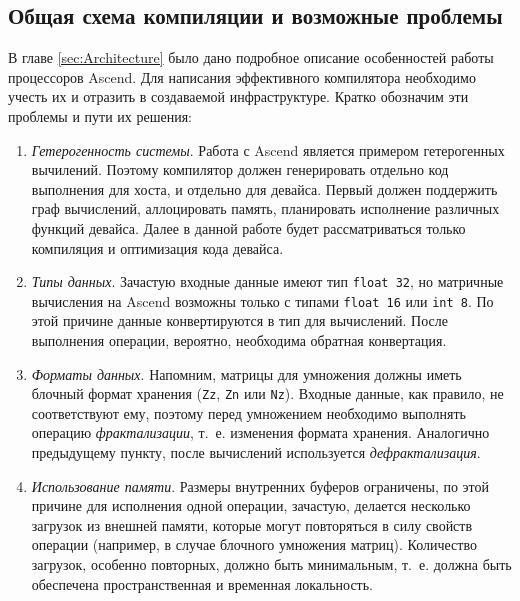 \subsection{Общая схема компиляции и возможные проблемы}
\label{impl:problem}

В главе \ref{sec:Architecture} было дано подробное описание особенностей работы процессоров Ascend.
Для написания эффективного компилятора необходимо учесть их и отразить
в создаваемой инфраструктуре. Кратко обозначим эти проблемы и пути их решения:

\begin{enumerate}
    \item \textit{Гетерогенность системы}. Работа с Ascend является примером
          гетерогенных вычилений. Поэтому компилятор должен генерировать
          отдельно код выполнения для хоста, и отдельно для девайса. Первый
          должен поддержить граф вычислений, аллоцировать память, планировать
          исполнение различных функций девайса. Далее в данной работе будет
          рассматриваться только компиляция и оптимизация кода девайса.
    
    \item \textit{Типы данных}. Зачастую входные данные имеют тип \texttt{float 32},
          но матричные вычисления на Ascend возможны только с типами
          \texttt{float 16} или \texttt{int 8}. По этой причине данные
          конвертируются в тип для вычислений. После выполнения операции,
          вероятно, необходима обратная конвертация.

    \item \textit{Форматы данных}. Напомним, матрицы для умножения должны иметь
          блочный формат хранения (\texttt{Zz}, \texttt{Zn} или \texttt{Nz}).
          Входные данные, как правило, не соответствуют ему, поэтому перед
          умножением необходимо выполнять операцию \textit{фрактализации}, т.~е.
          изменения формата хранения. Аналогично предыдущему пункту, после
          вычислений используется \textit{дефрактализация}.

    \item \textit{Использование памяти}. Размеры внутренних буферов ограничены,
          по этой причине для исполнения одной операции, зачастую, делается
          несколько загрузок из внешней памяти, которые могут повторяться в
          силу свойств операции (например, в случае блочного умножения матриц).
          Количество загрузок, особенно повторных, должно быть минимальным,
          т.~е. должна быть обеспечена пространственная и временная локальность.


\end{enumerate}
